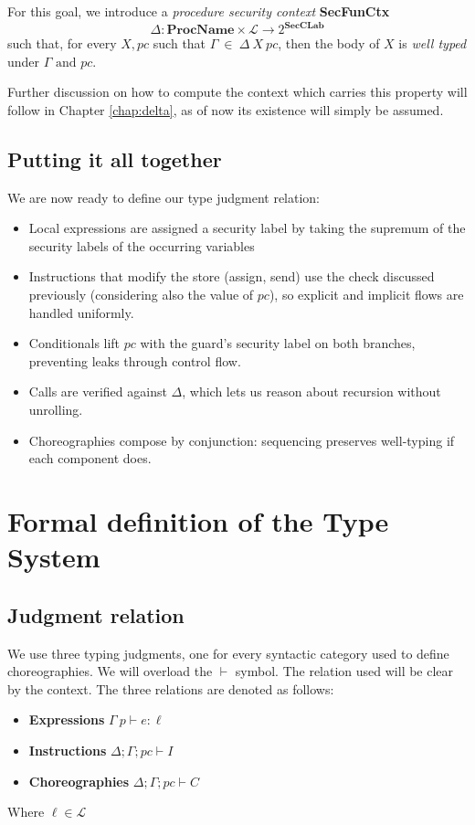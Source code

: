 \documentclass[12pt,a4paper,twoside]{book}
\newcommand{\MCL}{\mathscr{L}}
\begin{document}
For this goal, we introduce a \textit{procedure security context} \textbf{SecFunCtx}
$$\Delta: \textbf{ProcName} \times \MCL \rightarrow 2^\textbf{SecCLab}$$
such that, for every $X, pc$ such that $\Gamma ~ \in ~ \Delta ~ X ~ pc$, then the body of $X$ is \textit{well typed} under $\Gamma \text{ and } pc$.

Further discussion on how to compute the context which carries this property will follow in Chapter \ref{chap:delta}, as of now its existence will simply be assumed.

\subsection{Putting it all together}
We are now ready to define our type judgment relation:
\begin{itemize}
  \item Local expressions are assigned a security label by taking the supremum of the security labels of the occurring variables
  \item Instructions that modify the store (assign, send) use the check discussed previously (considering also the value of $pc$), so explicit and implicit flows are handled uniformly.
  \item Conditionals lift $pc$ with the guard's security label on both branches, preventing leaks through control flow.
  \item Calls are verified against $\Delta$, which lets us reason about recursion without unrolling.
  \item Choreographies compose by conjunction: sequencing preserves well-typing if each component does.
\end{itemize}

\section{Formal definition of the Type System}
\label{type:formal}

\subsection{Judgment relation}
We use three typing judgments, one for every syntactic category used to define choreographies. We will overload the $\vdash$ symbol. The relation used will be clear by the context. The three relations are denoted as follows:
\begin{itemize}
	\item{\textbf{Expressions}} \(\Gamma~p \vdash e : \ell\)
	\item{\textbf{Instructions}} \(\Delta;\Gamma;pc \vdash I\)
	\item{\textbf{Choreographies}} \(\Delta;\Gamma;pc \vdash C\)
\end{itemize}
Where $\ell \in \MCL$ 
\end{document}
